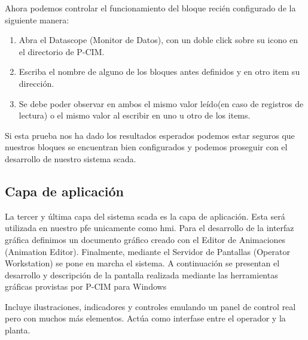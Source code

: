 Ahora podemos controlar el funcionamiento del bloque recién configurado de la siguiente manera:
\begin{enumerate}
 \item Abra el Datascope (Monitor de Datos), con un doble click sobre su icono en el
 directorio de P-CIM.
 \item Escriba el nombre de alguno de los bloques antes definidos  y en otro item su
 dirección.
 \item Se debe poder observar en ambos el mismo valor leído(en caso de registros de lectura) o el 
 mismo valor al escribir en uno u otro de los items.
\end{enumerate}
Si esta prueba nos ha dado los resultados esperados podemos estar seguros que nuestros bloques se encuentran 
bien configurados y podemos proseguir con el desarrollo de nuestro sistema \gls{scada}.


\subsection{Capa de aplicación}
\label{subsec:CapaAplicacion}
La tercer y última capa del sistema \gls{scada} es la capa de aplicación. Esta será utilizada en nuestro 
\gls{pfe} unicamente como \gls{hmi}. Para el desarrollo de la interfaz gráfica definimos un documento 
gráfico creado con el Editor de Animaciones (Animation Editor). Finalmente, mediante el Servidor de 
Pantallas (Operator Workstation) se pone en marcha el sistema. A continuación se presentan el desarrollo 
y descripción de la pantalla realizada mediante las herramientas gráficas provistas por P-CIM para Windows

Incluye ilustraciones, indicadores y controles emulando un panel de control real
pero con muchos más elementos. Actúa como interfase entre el operador y la planta.


